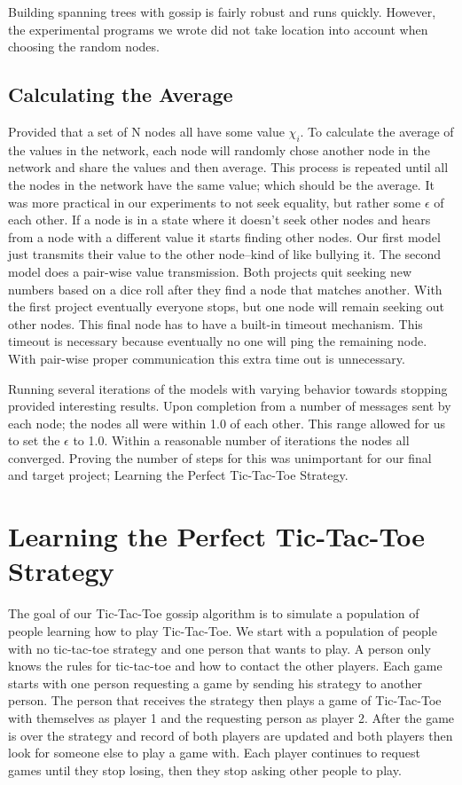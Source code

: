 \documentclass[11pt,twocolumn]{article}
\begin{document}
Building spanning trees with gossip is fairly robust and runs quickly.  However, the experimental programs we wrote did not take location into account when choosing the random nodes.

\subsection{Calculating the Average}

Provided that a set of N nodes all have some value $\chi_i$.  To calculate the average of the values in the network, each node will randomly chose another node in the network and share the values and then average.  This process is repeated until all the nodes in the network have the same value; which should be the average.  It was more practical in our experiments to not seek equality, but rather some $\epsilon$ of each other.  If a node is in a state where it doesn't seek other nodes and hears from a node with a different value it starts finding other nodes.  Our first model just transmits their value to the other node--kind of like bullying it.  The second model does a pair-wise value transmission.  Both projects quit seeking new numbers based on a dice roll after they find a node that matches another.  With the first project eventually everyone stops, but one node will remain seeking out other nodes.  This final node has to have a built-in timeout mechanism.  This timeout is necessary because eventually no one will ping the remaining node.  With pair-wise proper communication this extra time out is unnecessary.

Running several iterations of the models with varying behavior towards stopping provided interesting results.  Upon completion from a number of messages sent by each node; the nodes all were within 1.0 of each other.  This range allowed for us to set the $\epsilon$ to 1.0.  Within a reasonable number of iterations the nodes all converged.  Proving the number of steps for this was unimportant for our final and target project; Learning the Perfect Tic-Tac-Toe Strategy.

\section{Learning the Perfect Tic-Tac-Toe Strategy}

The goal of our Tic-Tac-Toe gossip algorithm is to simulate a population of people learning how to play Tic-Tac-Toe.  We start with a population of people with no tic-tac-toe strategy and one person that wants to play.  A person only knows the rules for tic-tac-toe and how to contact the other players.  Each game starts with one person requesting a game by sending his strategy to another person.  The person that receives the strategy then plays a game of Tic-Tac-Toe with themselves as player 1 and the requesting person as player 2.  After the game is over the strategy and record of both players are updated and both players then look for someone else to play a game with.  Each player continues to request games until they stop losing, then they stop asking other people to play.
\end{document}
